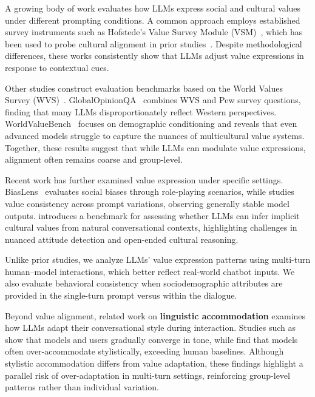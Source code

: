\documentclass[11pt,a4paper]{article}
\begin{document}
A growing body of work evaluates how LLMs express social and cultural values under different prompting conditions. A common approach employs established survey instruments such as Hofstede’s Value Survey Module (VSM)~\cite{vsm2013-jj}, which has been used to probe cultural alignment in prior studies~\cite{kharchenko2024llmsrepresentvaluescultures, arora2023probing, masoud-etal-2025-cultural}. Despite methodological differences, these works consistently show that LLMs adjust value expressions in response to contextual cues.


Other studies construct evaluation benchmarks based on the World Values Survey (WVS)~\cite{Haerpfer2020-qe}. GlobalOpinionQA~\cite{durmus2024towards} combines WVS and Pew survey questions, finding that many LLMs disproportionately reflect Western perspectives. WorldValueBench~\cite{zhao2024worldvaluesbenchlargescalebenchmarkdataset} focuses on demographic conditioning and reveals that even advanced models struggle to capture the nuances of multicultural value systems. Together, these results suggest that while LLMs can modulate value expressions, alignment often remains coarse and group-level.

Recent work has further examined value expression under specific settings. BiasLens~\cite{li2024benchmarkingbiaslargelanguage} evaluates social biases through role-playing scenarios, while \citet{moore-etal-2024-large} studies value consistency across prompt variations, observing generally stable model outputs. \citet{liu2025llmsgraspimplicitcultural} introduces a benchmark for assessing whether LLMs can infer implicit cultural values from natural conversational contexts, highlighting challenges in nuanced attitude detection and open-ended cultural reasoning.


Unlike prior studies, we analyze LLMs' value expression patterns using multi-turn human–model interactions, which better reflect real-world chatbot inputs. We also evaluate behavioral consistency when sociodemographic attributes are provided in the single-turn prompt versus within the dialogue.


Beyond value alignment, related work on \textbf{linguistic accommodation} examines how LLMs adapt their conversational style during interaction. Studies such as \cite{Chang_Wang_2025} show that models and users gradually converge in tone, while \citet{blevins2025languagemodelsaccommodateusers} find that models often over-accommodate stylistically, exceeding human baselines. Although stylistic accommodation differs from value adaptation, these findings highlight a parallel risk of over-adaptation in multi-turn settings, reinforcing group-level patterns rather than individual variation.
\end{document}
